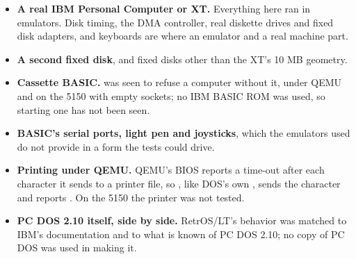 \begin{itemize}
\item \textbf{A real IBM Personal Computer or XT.} Everything here ran in
  emulators. Disk timing, the DMA controller, real diskette drives and
  fixed disk adapters, and keyboards are where an emulator and a real
  machine part.
\item \textbf{A second fixed disk}, and fixed disks other than the XT's
  10 MB geometry.
\item \textbf{Cassette BASIC.}  was seen to refuse
  a computer without it, under QEMU and on the 5150 with empty sockets;
  no IBM BASIC ROM was used, so starting one has not been seen.
\item \textbf{BASIC's serial ports, light pen and joysticks}, which the
  emulators used do not provide in a form the tests could drive.
\item \textbf{Printing under QEMU.} QEMU's BIOS reports a time-out after
  each character it sends to a printer file, so , like DOS's
  own , sends the character and reports .
  On the 5150 the printer was not tested.
\item \textbf{PC DOS 2.10 itself, side by side.} RetrOS/LT's behavior was
  matched to IBM's documentation and to what is known of PC DOS 2.10; no
  copy of PC DOS was used in making it.
\end{itemize}
